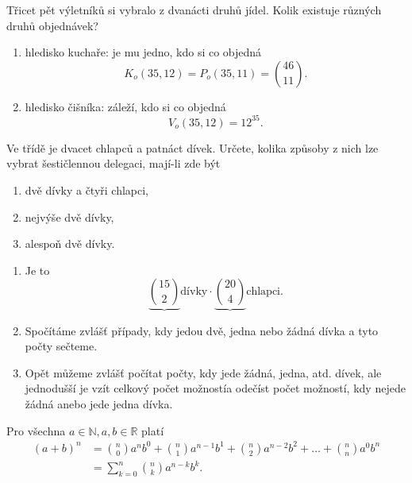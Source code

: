 \begin{priklad}
Třicet pět výletníků si vybralo z dvanácti druhů jídel. Kolik existuje
různých druhů objednávek?
\end{priklad}

\begin{reseni}
\begin{enumerate}[$i.$]
\item hledisko kuchaře: je mu jedno, kdo si co objedná
$$K_o(35,12)=P_o(35,11)=\binom{46}{11}.$$
\item hledisko čišníka: záleží, kdo si co objedná
$$V_o(35,12)=12^{35}.$$
\end{enumerate}
\end{reseni}

\begin{priklad}
Ve třídě je dvacet chlapců a patnáct dívek. Určete, kolika způsoby z nich lze vybrat
šestičlennou delegaci, mají-li zde být
\begin{enumerate}[$a.$]
\item dvě dívky a čtyři chlapci,
\item nejvýše dvě dívky,
\item alespoň dvě dívky.
\end{enumerate}
\end{priklad}

\begin{reseni}
\begin{enumerate}[$a.$]
\item Je to
$$\underbrace{\binom{15}{2}}{\textrm{dívky}} \cdot \underbrace{\binom{20}{4}}{\textrm{chlapci}}.$$
\item Spočítáme zvlášť případy, kdy jedou dvě, jedna nebo žádná dívka a tyto počty sečteme.
\item Opět můžeme zvlášť počítat počty, kdy jede žádná, jedna, atd. dívek, ale jednodušší
je vzít celkový počet možnostía odečíst počet možností, kdy nejede žádná anebo jede
jedna dívka.
\end{enumerate}
\end{reseni}

\begin{veta}
    Pro všechna $a \in \mathbb N, a,b \in \mathbb R$ platí
    \begin{align*}
        (a+b)^n & = \binom{n}{0}a^nb^0 + \binom{n}{1}a^{n-1}b^1 + \binom{n}{2}
        a^{n-2}b^2 + \dots + \binom{n}{n}a^0b^n \\
        &= \sum_{k=0}^n \binom{n}{k}a^{n-k}b^k.
    \end{align*}
\end{veta}

